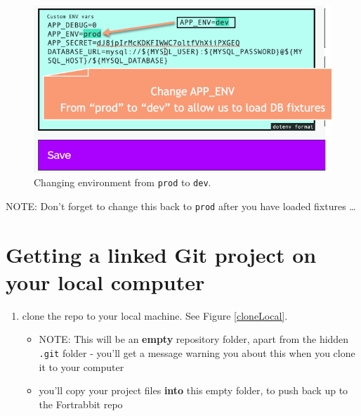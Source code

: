 \documentclass[a4paperpaper,openright]{book}
\begin{document}
\begin{figure}
\centering
\includegraphics{./tex2pdf.-5a4428120ede4be1/894c4dc95e174f508236060fa5116ee86653942c.png}
\caption{Changing environment from \texttt{prod} to \texttt{dev}.
\label{devEnvironment}}
\end{figure}

NOTE: Don't forget to change this back to \texttt{prod} after you have
loaded fixtures \ldots{}

\hypertarget{getting-a-linked-git-project-on-your-local-computer}{%
\section{Getting a linked Git project on your local
computer}\label{getting-a-linked-git-project-on-your-local-computer}}

\begin{enumerate}
\def\labelenumi{\arabic{enumi}.}
\item
  clone the repo to your local machine. See Figure \ref{cloneLocal}.

  \begin{itemize}
  \item
    NOTE: This will be an \textbf{empty} repository folder, apart from
    the hidden \texttt{.git} folder - you'll get a message warning you
    about this when you clone it to your computer
  \item
    you'll copy your project files \textbf{into} this empty folder, to
    push back up to the Fortrabbit repo
  \end{itemize}
\end{enumerate}
\end{document}
